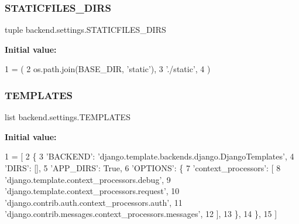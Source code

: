 \subsubsection{\texorpdfstring{S\+T\+A\+T\+I\+C\+F\+I\+L\+E\+S\+\_\+\+D\+I\+RS}{STATICFILES\_DIRS}}
{\footnotesize\ttfamily tuple backend.\+settings.\+S\+T\+A\+T\+I\+C\+F\+I\+L\+E\+S\+\_\+\+D\+I\+RS}

{\bfseries Initial value\+:}
\begin{DoxyCode}
1 =  (
2     os.path.join(BASE\_DIR, \textcolor{stringliteral}{'static'}),
3     \textcolor{stringliteral}{'./static'},
4 )
\end{DoxyCode}
\mbox{\label{namespacebackend_1_1settings_af0c121430c2489ac1b24ec86f0a31c15}} 
\subsubsection{\texorpdfstring{T\+E\+M\+P\+L\+A\+T\+ES}{TEMPLATES}}
{\footnotesize\ttfamily list backend.\+settings.\+T\+E\+M\+P\+L\+A\+T\+ES}

{\bfseries Initial value\+:}
\begin{DoxyCode}
1 =  [
2     \{
3         \textcolor{stringliteral}{'BACKEND'}: \textcolor{stringliteral}{'django.template.backends.django.DjangoTemplates'},
4         \textcolor{stringliteral}{'DIRS'}: [],
5         \textcolor{stringliteral}{'APP\_DIRS'}: \textcolor{keyword}{True},
6         \textcolor{stringliteral}{'OPTIONS'}: \{
7             \textcolor{stringliteral}{'context\_processors'}: [
8                 \textcolor{stringliteral}{'django.template.context\_processors.debug'},
9                 \textcolor{stringliteral}{'django.template.context\_processors.request'},
10                 \textcolor{stringliteral}{'django.contrib.auth.context\_processors.auth'},
11                 \textcolor{stringliteral}{'django.contrib.messages.context\_processors.messages'},
12             ],
13         \},
14     \},
15 ]
\end{DoxyCode}
